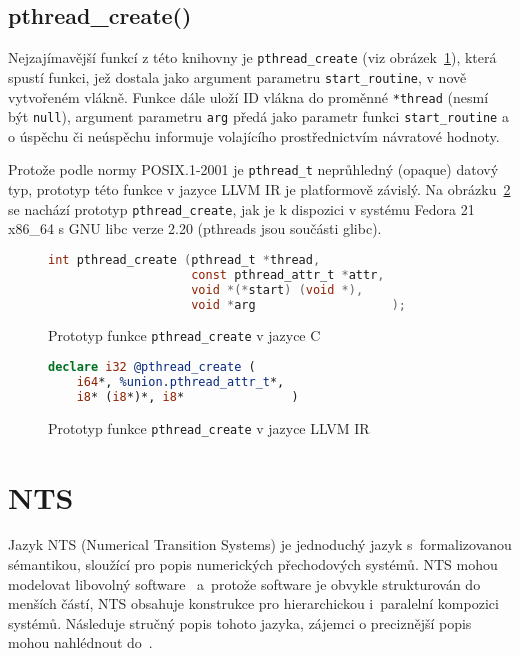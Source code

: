 \documentclass[12pt]{fithesis2}
\begin{document}
\subsection{pthread_create()}
Nejzajímavější funkcí z této knihovny je \texttt{pthread\_create}\cite{man-pthread-create} (viz obrázek~\ref{fig:pthread-create-c}), která spustí funkci, jež dostala jako argument parametru \texttt{start\_routine}, v nově vytvořeném vlákně. Funkce dále uloží ID vlákna do proměnné \texttt{*thread} (nesmí být \texttt{null}), argument parametru \texttt{arg} předá jako parametr funkci \texttt{start\_routine} a o úspěchu či neúspěchu informuje volajícího prostřednictvím návratové hodnoty.

Protože podle normy POSIX.1-2001 \cite{posix} je \texttt{pthread\_t} neprůhledný (opaque) datový typ, prototyp této funkce v jazyce LLVM IR je platformově závislý. Na obrázku~\ref{fig:pthread-create-llvm} se nachází prototyp \texttt{pthread\_create}, jak je k dispozici v systému Fedora 21 x86_64 s GNU libc verze 2.20 (pthreads jsou součásti glibc).

\begin{figure}[h!]
\begin{lstlisting}[language=C]
int pthread_create (pthread_t *thread,
                    const pthread_attr_t *attr,
                    void *(*start) (void *),
                    void *arg                   );
\end{lstlisting}
\label{fig:pthread-create-c}
\caption{Prototyp funkce \texttt{pthread_create} v jazyce C}
\end{figure}

\begin{figure}[h!]
\begin{lstlisting}[language=llvm]
declare i32 @pthread_create (
	i64*, %union.pthread_attr_t*,
	i8* (i8*)*, i8*               )
\end{lstlisting}
\label{fig:pthread-create-llvm}
\caption{Prototyp funkce \texttt{pthread_create} v jazyce LLVM IR}
\end{figure}

\section{NTS}
Jazyk NTS (Numerical Transition Systems) je jednoduchý jazyk s~formalizovanou sémantikou, sloužící pro popis numerických přechodových systémů. NTS mohou modelovat libovolný software~\cite{NTSref} a~protože software je obvykle strukturován do menších částí, NTS obsahuje konstrukce pro hierarchickou i~paralelní kompozici systémů. Následuje stručný popis tohoto jazyka, zájemci o preciznější popis mohou nahlédnout do~\cite{NTSref}.
\end{document}
